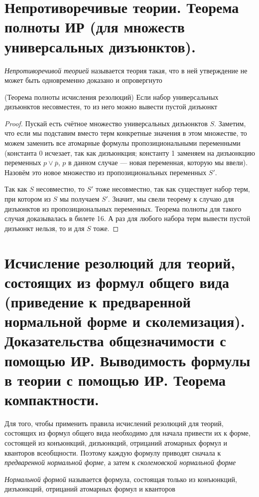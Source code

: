 \documentclass{article}
\begin{document}
\section{Непротиворечивые теории. Теорема полноты ИР (для множеств универсальных дизъюнктов).}
\begin{definition}
	\textit{Непротиворечивой теорией} называется теория такая, что в ней утверждение не может быть одновременно доказано и опровергнуто
\end{definition}

\begin{theorem}{(Теорема полноты исчисления резолюций)}
	Если набор универсальных дизъюнктов несовместен, то из него можно вывести пустой дизъюнкт
\end{theorem}
\begin{proof}
	Пускай есть счётное множество универсальных дизъюнктов $S$. Заметим, что если мы подставим вместо терм конкретные значения в этом множестве, то можем заменить все атомарные формулы пропозициональными переменными (константа 0 исчезает, так как дизъюнкция; константу 1 заменяем на дизъюнкцию переменных $p \vee \overline p$, $p$ в данном случае --- новая переменная, которую мы ввели). Назовём это новое множество из пропозициональных переменных $S'$.
	
	Так как $S$ несовместно, то $S'$ тоже несовместно, так как существует набор терм, при котором из $S$ мы получаем $S'$. Значит, мы свели теорему к случаю для дизъюнктов из пропозициональных переменных. Теорема полноты для такого случая доказывалась в билете 16. А раз для любого набора терм вывести пустой дизъюнкт нельзя, то и для $S$ тоже. 
\end{proof}

\section{Исчисление резолюций для теорий, состоящих из формул общего вида (приведение к предваренной нормальной форме и сколемизация). Доказательства общезначимости с помощью ИР. Выводимость формулы в теории с помощью ИР. Теорема компактности.}
Для того, чтобы применить правила исчислений резолюций для теорий, состоящих из формул общего вида необходимо для начала привести их к форме, состоящей из конъюнкций, дизъюнкций, отрицаний атомарных формул и кванторов всеобщности. Поэтому каждую формулу приводят сначала к \textit{предваренной нормальной форме}, а затем к \textit{сколемовской нормальной форме}

\begin{definition}
	\textit{Нормальной формой} называется формула, состоящая только из конъюнкций, дизъюнкций, отрицаний атомарных формул и кванторов
\end{definition}
\end{document}
